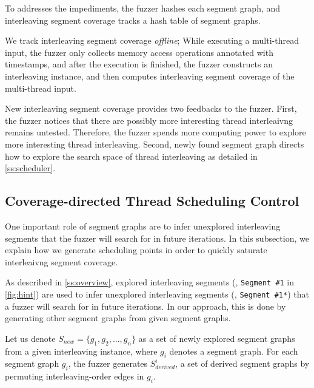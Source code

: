 To addresses the impediments, the fuzzer hashes each segment graph,
and interleaving segment coverage tracks a hash table of segment
graphs.
%





We track interleaving segment coverage \textit{offline}; While
executing a multi-thread input, the fuzzer only collects memory access
operations annotated with timestamps, and after the execution is
finished, the fuzzer constructs an interleaving instance, and then
computes interleaving segment coverage of the multi-thread input.


%
New interleaving segment coverage provides two feedbacks to the
fuzzer.
%
First, the fuzzer notices that there are possibly more interesting
thread interleaivng remains untested. Therefore, the fuzzer spends
more computing power to explore more interesting thread interleaving.
%
Second, newly found segment graph directs how to explore the search
space of thread interleaving as detailed in \autoref{ss:scheduler}.





\subsection{Coverage-directed Thread Scheduling Control}
\label{ss:scheduler}
%
One important role of segment graphs are to infer unexplored
interleaving segments that the fuzzer will search for in future
iterations.
%
In this subsection, we explain how we generate scheduling points in
order to quickly saturate interleaivng segment coverage.

%
As described in \autoref{ss:overview}, explored interleaving segments
(\eg, \texttt{Segment \#1} in \autoref{fig:hint}) are used to infer
unexplored interleaving segments (\eg, \texttt{Segment \#1*}) that a
fuzzer will search for in future iterations.
%
In our approach, this is done by generating other segment graphs from
given segment graphs.

Let us denote $S_{new} = \{g_1, g_2, ..., g_n \}$ as a set of newly
explored segment graphs from a given interleaving instance, where
$g_i$ denotes a segment graph.
%
For each segment graph $g_i$, the fuzzer generates $S^{i}_{derived}$,
a set of derived segment graphs by permuting interleaving-order edges
in $g_i$.


